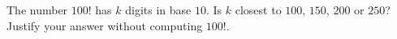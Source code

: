 The number $100!$ has $k$ digits in base $10$. Is $k$ closest to $100$, $150$, $200$ or $250$? Justify your answer without computing $100!$.

